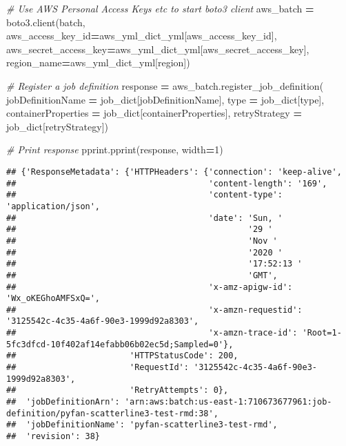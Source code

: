 \documentclass[
]{book}
\newenvironment{Shaded}{\begin{snugshade}}{\end{snugshade}}
\newcommand{\BuiltInTok}[1]{#1}
\newcommand{\CommentTok}[1]{\textcolor[rgb]{0.56,0.35,0.01}{\textit{#1}}}
\newcommand{\DecValTok}[1]{\textcolor[rgb]{0.00,0.00,0.81}{#1}}
\newcommand{\NormalTok}[1]{#1}
\newcommand{\OperatorTok}[1]{\textcolor[rgb]{0.81,0.36,0.00}{\textbf{#1}}}
\newcommand{\StringTok}[1]{\textcolor[rgb]{0.31,0.60,0.02}{#1}}
\begin{document}
\begin{Shaded}
\begin{Highlighting}[]
\CommentTok{\# Use AWS Personal Access Keys etc to start boto3 client}
\NormalTok{aws\_batch }\OperatorTok{=}\NormalTok{ boto3.client(}\StringTok{\textquotesingle{}batch\textquotesingle{}}\NormalTok{,}
\NormalTok{  aws\_access\_key\_id}\OperatorTok{=}\NormalTok{aws\_yml\_dict\_yml[}\StringTok{\textquotesingle{}aws\_access\_key\_id\textquotesingle{}}\NormalTok{],}
\NormalTok{  aws\_secret\_access\_key}\OperatorTok{=}\NormalTok{aws\_yml\_dict\_yml[}\StringTok{\textquotesingle{}aws\_secret\_access\_key\textquotesingle{}}\NormalTok{],}
\NormalTok{  region\_name}\OperatorTok{=}\NormalTok{aws\_yml\_dict\_yml[}\StringTok{\textquotesingle{}region\textquotesingle{}}\NormalTok{])}

\CommentTok{\# Register a job definition}
\NormalTok{response }\OperatorTok{=}\NormalTok{ aws\_batch.register\_job\_definition(}
\NormalTok{        jobDefinitionName }\OperatorTok{=}\NormalTok{ job\_dict[}\StringTok{\textquotesingle{}jobDefinitionName\textquotesingle{}}\NormalTok{],}
        \BuiltInTok{type} \OperatorTok{=}\NormalTok{ job\_dict[}\StringTok{\textquotesingle{}type\textquotesingle{}}\NormalTok{],}
\NormalTok{        containerProperties }\OperatorTok{=}\NormalTok{ job\_dict[}\StringTok{\textquotesingle{}containerProperties\textquotesingle{}}\NormalTok{],}
\NormalTok{        retryStrategy }\OperatorTok{=}\NormalTok{ job\_dict[}\StringTok{\textquotesingle{}retryStrategy\textquotesingle{}}\NormalTok{])}

\CommentTok{\# Print response}
\NormalTok{pprint.pprint(response, width}\OperatorTok{=}\DecValTok{1}\NormalTok{)}
\end{Highlighting}
\end{Shaded}

\begin{verbatim}
## {'ResponseMetadata': {'HTTPHeaders': {'connection': 'keep-alive',
##                                       'content-length': '169',
##                                       'content-type': 'application/json',
##                                       'date': 'Sun, '
##                                               '29 '
##                                               'Nov '
##                                               '2020 '
##                                               '17:52:13 '
##                                               'GMT',
##                                       'x-amz-apigw-id': 'Wx_oKEGhoAMFSxQ=',
##                                       'x-amzn-requestid': '3125542c-4c35-4a6f-90e3-1999d92a8303',
##                                       'x-amzn-trace-id': 'Root=1-5fc3dfcd-10f402af14efabb06b02ec5d;Sampled=0'},
##                       'HTTPStatusCode': 200,
##                       'RequestId': '3125542c-4c35-4a6f-90e3-1999d92a8303',
##                       'RetryAttempts': 0},
##  'jobDefinitionArn': 'arn:aws:batch:us-east-1:710673677961:job-definition/pyfan-scatterline3-test-rmd:38',
##  'jobDefinitionName': 'pyfan-scatterline3-test-rmd',
##  'revision': 38}
\end{verbatim}
\end{document}
